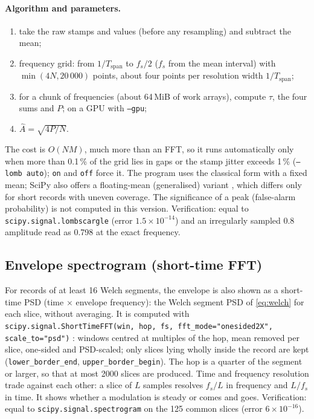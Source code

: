 \documentclass[10pt,letterpaper]{article}
\numberwithin{equation}{section}
\begin{document}
\paragraph{Algorithm and parameters.}
\begin{enumerate}
\item take the raw stamps and values (before any resampling) and subtract the mean;
\item frequency grid: from $1/T_\mathrm{span}$ to $f_s/2$ ($f_s$ from the mean
interval) with $\min(4N, 20\,000)$ points, about four points per resolution
width $1/T_\mathrm{span}$;
\item for a chunk of frequencies (about 64\,MiB of work arrays), compute $\tau$,
the four sums and $P$; on a GPU with \texttt{--gpu};
\item $\hat{A} = \sqrt{4P/N}$.
\end{enumerate}
The cost is $O(NM)$, much more than an FFT, so it runs automatically only when
more than 0.1\,\% of the grid lies in gaps or the stamp jitter exceeds 1\,\%
(\texttt{--lomb auto}); \texttt{on} and \texttt{off} force it. The program uses the
classical form with a fixed mean; SciPy also offers a floating-mean
(generalised) variant \cite{R14}, which differs only for short records with
uneven coverage. The significance of a peak (false-alarm probability) is not
computed in this version. Verification: equal to \texttt{scipy.signal.lombscargle}
(error $1.5\times10^{-14}$) and an irregularly sampled 0.8 amplitude read as
0.798 at the exact frequency.

\subsection{Envelope spectrogram (short-time FFT)}\label{sec:stft}
For records of at least 16 Welch segments, the envelope is also shown as a
short-time PSD (time $\times$ envelope frequency): the Welch segment PSD of
\eqref{eq:welch} for each slice, without averaging. It is computed with
\texttt{scipy.signal.ShortTimeFFT(win, hop, fs, fft\_mode="onesided2X",
scale\_to="psd")} \cite{B30}: windows centred at multiples of the hop, mean
removed per slice, one-sided and PSD-scaled; only slices lying wholly inside the
record are kept (\texttt{lower\_border\_end}, \texttt{upper\_border\_begin}).
The hop is a quarter of the segment or larger, so that at most 2000 slices are
produced. Time and frequency resolution trade against each other: a slice of
$L$ samples resolves $f_s/L$ in frequency and $L/f_s$ in time. It shows whether a
modulation is steady or comes and goes. Verification: equal to
\texttt{scipy.signal.spectrogram} on the 125 common slices (error $6\times10^{-16}$).
\end{document}
